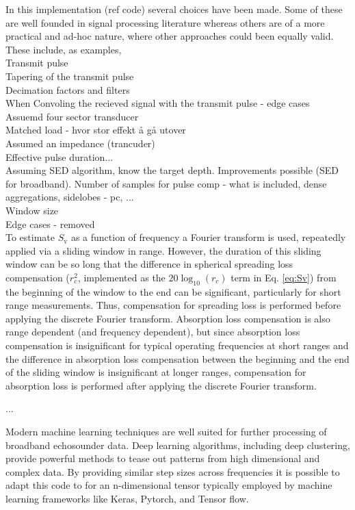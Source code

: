 \documentclass[preprint,12pt,TurnOnLineNumbers]{JASAnew}
\newcommand{\sv}{S_{\textrm{v}}}
\newcommand{\range}{r}
\begin{document}
In this implementation (ref code) several choices have been made. Some of these are well founded in signal processing literature whereas others are of a more practical and ad-hoc nature, where other approaches could been equally valid. These include, as examples,\\ 
Transmit pulse\\
Tapering of the transmit pulse\\
Decimation factors and filters\\
When Convoling the recieved signal with the transmit pulse - edge cases\\
Assuemd four sector transducer\\
Matched load - hvor stor effekt å gå utover \\
Assumed an impedance (trancuder)\\
Effective pulse duration...\\
Assuming SED algorithm, know the target depth. Improvements possible (SED for broadband). Number of samples for pulse comp - what is included, dense aggregations, sidelobes - pc, ...\\
Window size\\
Edge cases - removed\\

To estimate $\sv$ as a function of frequency a Fourier transform is used, repeatedly applied via a sliding window in range. However, the duration of this sliding window can be so long that the difference in spherical spreading loss compensation ($r_c^2$, implemented as the $20\log_{10}(\range_c)$ term in Eq. \ref{eq:Sv}) from the beginning of the window to the end can be significant, particularly for short range measurements. Thus, compensation for spreading loss is performed before applying the discrete Fourier transform. Absorption loss compensation is also range dependent (and frequency dependent), but since absorption loss compensation is insignificant for typical operating frequencies at short ranges and the difference in absorption loss compensation between the beginning and the end of the sliding window is insignificant at longer ranges, compensation for absorption loss is performed after applying the discrete Fourier transform.

...

Modern machine learning techniques are well suited for further processing of broadband echosounder data. Deep learning algorithms, including deep clustering, provide powerful methods to tease out patterns from high dimensional and complex data. By providing similar step sizes across frequencies it is possible to adapt this code to for an n-dimensional tensor typically employed by machine learning frameworks like Keras, Pytorch, and Tensor flow. 
\end{document}
